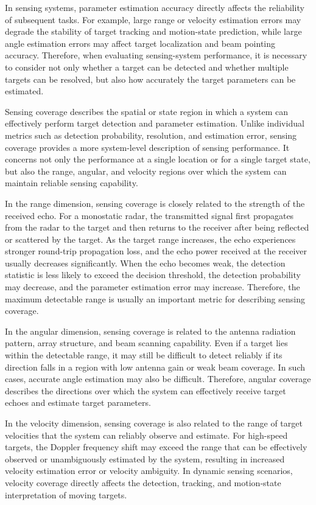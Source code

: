 In sensing systems, parameter estimation accuracy directly affects the
reliability of subsequent tasks.
For example, large range or velocity estimation errors may degrade the
stability of target tracking and motion-state prediction, while large angle
estimation errors may affect target localization and beam pointing accuracy.
Therefore, when evaluating sensing-system performance, it is necessary to
consider not only whether a target can be detected and whether multiple targets
can be resolved, but also how accurately the target parameters can be
estimated.

Sensing coverage describes the spatial or state region in which a system can
effectively perform target detection and parameter estimation.
Unlike individual metrics such as detection probability, resolution, and
estimation error, sensing coverage provides a more system-level description
of sensing performance.
It concerns not only the performance at a single location or for a single
target state, but also the range, angular, and velocity regions over which the
system can maintain reliable sensing capability.

In the range dimension, sensing coverage is closely related to the strength of
the received echo.
For a monostatic radar, the transmitted signal first propagates from the radar
to the target and then returns to the receiver after being reflected or
scattered by the target.
As the target range increases, the echo experiences stronger round-trip
propagation loss, and the echo power received at the receiver usually decreases
significantly.
When the echo becomes weak, the detection statistic is less likely to exceed
the decision threshold, the detection probability may decrease, and the
parameter estimation error may increase.
Therefore, the maximum detectable range is usually an important metric for
describing sensing coverage.

In the angular dimension, sensing coverage is related to the antenna radiation
pattern, array structure, and beam scanning capability.
Even if a target lies within the detectable range, it may still be difficult
to detect reliably if its direction falls in a region with low antenna gain or
weak beam coverage.
In such cases, accurate angle estimation may also be difficult.
Therefore, angular coverage describes the directions over which the system can
effectively receive target echoes and estimate target parameters.

In the velocity dimension, sensing coverage is also related to the range of
target velocities that the system can reliably observe and estimate.
For high-speed targets, the Doppler frequency shift may exceed the range that
can be effectively observed or unambiguously estimated by the system, resulting
in increased velocity estimation error or velocity ambiguity.
In dynamic sensing scenarios, velocity coverage directly affects the detection,
tracking, and motion-state interpretation of moving targets.

